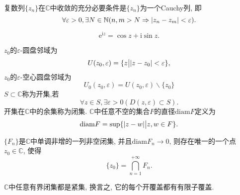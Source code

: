 	\begin{theorem}
		复数列$\{z_n \}$在$\mathbb{C}$中收敛的充分必要条件是$\{z_n\}$为一个Cauchy列, 即
		\begin{equation*}
			\forall\varepsilon>0,\exists N\in\mathbb{N} (n,m>N\Rightarrow \lvert z_n-z_m\rvert<\varepsilon).
		\end{equation*}
	\end{theorem}
	
	\begin{theorem}[Euler 公式]
		\begin{equation*}
			\mathrm{e}^{\mathrm{i}z} = \cos z+\mathrm{i}\sin z.
		\end{equation*}
	\end{theorem}

	\begin{definition}[复平面上拓扑的几个定义]
		$z_0$的$\varepsilon$-圆盘邻域为\begin{equation*}
			U(z_0,\varepsilon) = \{z\big| \lvert z-z_0\rvert<\varepsilon \},
		\end{equation*}
		$z_0$的$\varepsilon$-空心圆盘邻域为\begin{equation*}
			U_0(z_0,\varepsilon) = U(z_0,\varepsilon)\backslash \{z_0\}
		\end{equation*}
		$S\subset \mathbb{C}$称为开集,若\begin{equation*}
			\forall z\in S,\exists\varepsilon>0 (D(z,\varepsilon)\subset S).
		\end{equation*}
		开集在$\mathbb{C}$中的余集称为闭集.
		$\mathbb{C}$中任意不空的集合$F$的直径$\mathrm{diam}F$定义为\begin{equation*}
			\mathrm{diam}F = \sup\{ \lvert z-w\rvert\big| z,w\in F \}.
		\end{equation*}
	\end{definition}

	\begin{theorem}[闭集套定理]
		$\{F_n\}$是$\mathbb{C}$中单调非增的一列非空闭集, 并且$\mathrm{diam}F_n\to 0$, 则存在唯一的一个点$z_0\in\mathbb{C}$, 使得
		\begin{equation*}
			\{z_0\} = \bigcap_{n = 1}^{+\infty}F_n.
		\end{equation*}
	\end{theorem}

	\begin{theorem}[开覆盖定理]
		$\mathbb{C}$中任意有界闭集都是紧集, 换言之, 它的每个开覆盖都有有限子覆盖.
	\end{theorem}
	
